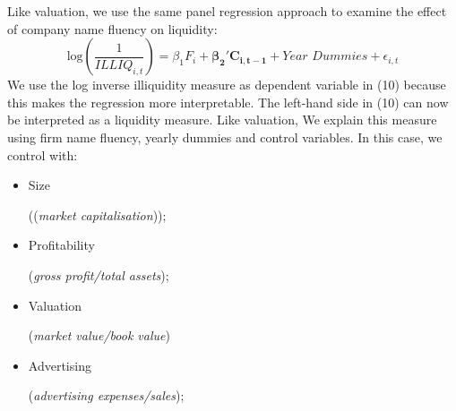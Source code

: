 \documentclass[11pt]{article}
\begin{document}
Like valuation, we use the same panel regression approach to examine the effect of company name fluency on liquidity: 
\begin{equation}
    \text{log}(\frac{1}{ILLIQ_{i,t}}) = \beta_1F_{i} + \boldsymbol{\beta_2'C_{i,t-1}} + \textit{Year Dummies} + \epsilon_{i,t}
\end{equation}
We use the log inverse illiquidity measure as dependent variable in (10) because this makes the regression more interpretable. The left-hand side in (10) can now be interpreted as a liquidity measure. Like valuation, We explain this measure using firm name fluency, yearly dummies and control variables. In this case, we control with:
\vspace{0.25cm}
\begin{itemize}
\setlength\itemsep{-0.5em}
    \item \begin{minipage}[t]{0.3\textwidth}
            Size
        \end{minipage}
        \begin{minipage}[t]{0.45\textwidth}
            ((\textit{market capitalisation}));
        \end{minipage}
        
    \item \begin{minipage}[t]{0.3\textwidth}
            Profitability
        \end{minipage}
        \begin{minipage}[t]{0.45\textwidth}
            (\textit{gross profit/total assets});
        \end{minipage}
        
    \item \begin{minipage}[t]{0.3\textwidth}
            Valuation
        \end{minipage}
        \begin{minipage}[t]{0.45\textwidth}
           (\textit{market value/book value})
        \end{minipage}


    \item \begin{minipage}[t]{0.3\textwidth}
            Advertising
        \end{minipage}
        \begin{minipage}[t]{0.45\textwidth}
           (\textit{advertising expenses/sales});
        \end{minipage}


\end{itemize}
\end{document}
